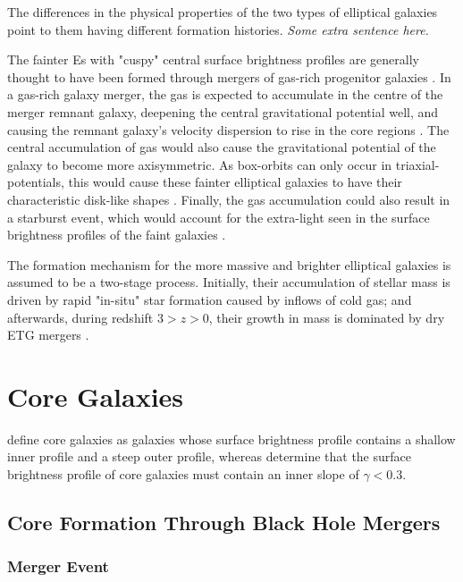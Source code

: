 \documentclass[english, oneside]{HYgradu}
\begin{document}
The differences in the physical properties of the two types of elliptical galaxies point to them having different formation histories. \textit{Some extra sentence here.}

The fainter Es with "cuspy" central surface brightness profiles are generally thought to have been formed through mergers of gas-rich progenitor galaxies \citep{Barnes1996}. In a gas-rich galaxy merger, the gas is expected to accumulate in the centre of the merger remnant galaxy, deepening the central gravitational potential well, and causing the remnant galaxy's velocity dispersion to rise in the core regions \citep{Mihos1994, Barnes1996}. The central accumulation of gas would also cause the gravitational potential of the galaxy to become more axisymmetric. As box-orbits can only occur in triaxial-potentials, this would cause these fainter elliptical galaxies to have their characteristic disk-like shapes \citep[wrong citation:][]{Naab2006}. Finally, the gas accumulation could also result in a starburst event, which would account for the extra-light seen in the surface brightness profiles of the faint galaxies \citep{Mihos1994, Hopkins2008}.


The formation mechanism for the more massive and brighter elliptical galaxies is assumed to be a two-stage process. Initially, their accumulation of stellar mass is driven by rapid "in-situ" star formation caused by inflows of cold gas; and afterwards, during redshift $3 > z > 0$, their growth in mass is dominated by dry ETG mergers \citep{Naab2009}.

\section{Core Galaxies}

\cite{Kormendy1999} define core galaxies as galaxies whose surface brightness profile contains a shallow inner profile and a steep outer profile, whereas \cite{Lauer1995} determine that the surface brightness profile of core galaxies must contain an inner slope of $\gamma < 0.3$. 

\subsection{Core Formation Through Black Hole Mergers}

\subsubsection{Merger Event}
\end{document}
